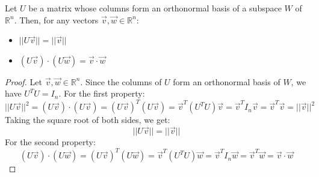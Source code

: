 \begin{theorem}
    Let $U$ be a matrix whose columns form an orthonormal basis of a subspace $W$ of $\mathbb{R}^n$. Then, for any vectors $\vec{v}, \vec{w} \in \mathbb{R}^n$:
    \begin{itemize}[itemsep=1pt,label=$\circ$]
        \item $||U\vec{v}|| = ||\vec{v}||$
        \item $(U\vec{v}) \cdot (U\vec{w}) = \vec{v} \cdot \vec{w}$
    \end{itemize}
\end{theorem}
\begin{proof}
    Let $\vec{v}, \vec{w} \in \mathbb{R}^n$. Since the columns of $U$ form an orthonormal basis of $W$, we have $U^T U = I_n$.
    For the first property:
    \[
        ||U\vec{v}||^2 = (U\vec{v}) \cdot (U\vec{v}) = (U\vec{v})^T (U\vec{v}) = \vec{v}^T (U^T U) \vec{v} = \vec{v}^T I_n \vec{v} = \vec{v}^T \vec{v} = ||\vec{v}||^2
    \]
    Taking the square root of both sides, we get:
    \[
        ||U\vec{v}|| = ||\vec{v}||
    \]
    For the second property:
    \[
        (U\vec{v}) \cdot (U\vec{w}) = (U\vec{v})^T (U\vec{w}) = \vec{v}^T (U^T U) \vec{w} = \vec{v}^T I_n \vec{w} = \vec{v}^T \vec{w} = \vec{v} \cdot \vec{w}
    \]
\end{proof}

